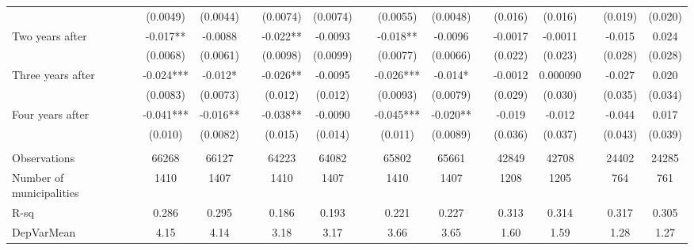 \begin{tabular}{lcccccccccccccc}
      & (0.0049) & (0.0044) &       & (0.0074) & (0.0074) &       & (0.0055) & (0.0048) &       & (0.016) & (0.016) &       & (0.019) & (0.020) \\
Two years after & -0.017** & -0.0088 &       & -0.022** & -0.0093 &       & -0.018** & -0.0096 &       & -0.0017 & -0.0011 &       & -0.015 & 0.024 \\
      & (0.0068) & (0.0061) &       & (0.0098) & (0.0099) &       & (0.0077) & (0.0066) &       & (0.022) & (0.023) &       & (0.028) & (0.028) \\
Three years after & -0.024*** & -0.012* &       & -0.026** & -0.0095 &       & -0.026*** & -0.014* &       & -0.0012 & 0.000090 &       & -0.027 & 0.020 \\
      & (0.0083) & (0.0073) &       & (0.012) & (0.012) &       & (0.0093) & (0.0079) &       & (0.029) & (0.030) &       & (0.035) & (0.034) \\
Four years after & -0.041*** & -0.016** &       & -0.038** & -0.0090 &       & -0.045*** & -0.020** &       & -0.019 & -0.012 &       & -0.044 & 0.017 \\
      & (0.010) & (0.0082) &       & (0.015) & (0.014) &       & (0.011) & (0.0089) &       & (0.036) & (0.037) &       & (0.043) & (0.039) \\
      &       &       &       &       &       &       &       &       &       &       &       &       &       &  \\
\midrule
Observations & 66268 & 66127 &       & 64223 & 64082 &       & 65802 & 65661 &       & 42849 & 42708 &       & 24402 & 24285 \\
Number of municipalities & 1410  & 1407  &       & 1410  & 1407  &       & 1410  & 1407  &       & 1208  & 1205  &       & 764   & 761 \\
R-sq  & 0.286 & 0.295 &       & 0.186 & 0.193 &       & 0.221 & 0.227 &       & 0.313 & 0.314 &       & 0.317 & 0.305 \\
DepVarMean & 4.15  & 4.14  &       & 3.18  & 3.17  &       & 3.66  & 3.65  &       & 1.60  & 1.59  &       & 1.28  & 1.27 \\
\bottomrule
\bottomrule
\end{tabular}%
